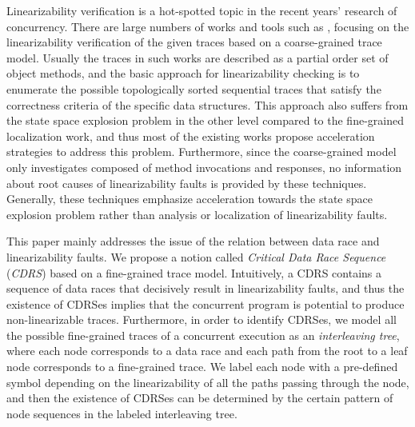 \documentclass[runningheads]{llncs}
\begin{document}
Linearizability verification is a hot-spotted topic in the recent years' research of concurrency. There are large numbers of works and tools such as
\cite{DBLP:conf/popl/BouajjaniEEH15,DBLP:conf/pldi/BurckhardtDMT10,DBLP:conf/popl/BouajjaniEEH15,DBLP:conf/forte/HornK15a,DBLP:conf/sac/LongZ16,DBLP:journals/concurrency/Lowe17}, 
focusing on the linearizability verification of the given traces based on a coarse-grained trace model.
Usually the traces in such works are described as a partial order set of object methods, and the basic approach 
for linearizability checking is to enumerate the possible topologically sorted sequential traces that satisfy the correctness criteria of the specific data structures.
This approach also suffers from the state space explosion problem in the other level compared to the fine-grained localization work, and thus
most of the existing works propose acceleration strategies to address this problem.
Furthermore, since the coarse-grained model only investigates composed of method invocations and responses, 
no information about root causes of linearizability faults is provided by these techniques. 
Generally, these techniques emphasize acceleration towards the state space explosion problem rather than analysis or localization of linearizability faults.



 This paper mainly addresses the issue of the relation between data race and linearizability faults. 
 We propose a notion called \textit{Critical Data Race Sequence} (\textit{CDRS}) based on a fine-grained trace model. 
 Intuitively, a CDRS contains a sequence of data races that decisively result in linearizability faults, 
 and thus the existence of CDRSes implies that the concurrent program is potential to produce non-linearizable traces. 
 Furthermore, in order to identify CDRSes, we model all the possible fine-grained traces of a concurrent execution as an \textit{interleaving tree}, 
 where each node corresponds to a data race and each path from the root to a leaf node corresponds to a fine-grained trace. 
 We label each node with a pre-defined symbol depending on the linearizability of all the paths passing through the node, and 
 then the existence of CDRSes can be determined by the certain pattern of node sequences in the labeled interleaving tree.
\end{document}
